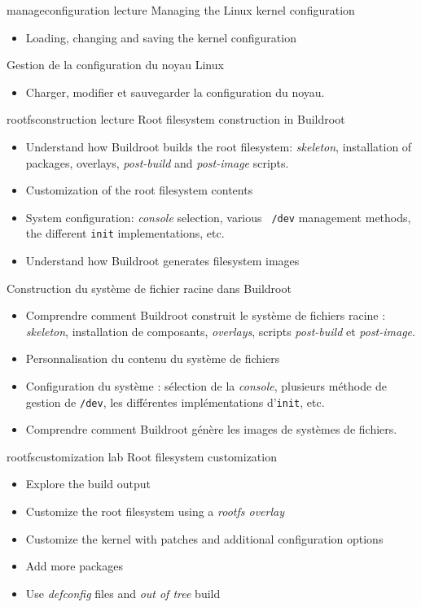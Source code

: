 {manageconfiguration}
{lecture}
{Managing the Linux kernel configuration}
{
  \begin{itemize}
  \item Loading, changing and saving the kernel configuration
  \end{itemize}
}
{Gestion de la configuration du noyau Linux}
{
  \begin{itemize}
  \item Charger, modifier et sauvegarder la configuration du noyau.
  \end{itemize}
}
{rootfsconstruction}
{lecture}
{Root filesystem construction in Buildroot}
{
  \begin{itemize}
  \item Understand how Buildroot builds the root filesystem: {\em
      skeleton}, installation of packages, overlays, {\em post-build}
    and {\em post-image} scripts.
  \item Customization of the root filesystem contents
  \item System configuration: {\em console} selection, various {\tt
      /dev} management methods, the different {\tt init}
    implementations, etc.
  \item Understand how Buildroot generates filesystem images
  \end{itemize}
}
{Construction du système de fichier racine dans Buildroot}
{
  \begin{itemize}
  \item Comprendre comment Buildroot construit le système de fichiers
	racine : {\em skeleton}, installation de composants, {\em
        overlays}, scripts {\em post-build} et {\em post-image}.
  \item Personnalisation du contenu du système de fichiers
  \item Configuration du système : sélection de la {\em console},
	plusieurs méthode de gestion de {\tt /dev}, les différentes
	implémentations d'{\tt init}, etc.
  \item Comprendre comment Buildroot génère les images de systèmes de
	fichiers.
  \end{itemize}
}
{rootfscustomization}
{lab}
{Root filesystem customization}
{
  \begin{itemize}
  \item Explore the build output
  \item Customize the root filesystem using a {\em rootfs overlay}
  \item Customize the kernel with patches and additional configuration
    options
  \item Add more packages
  \item Use {\em defconfig} files and {\em out of tree} build
  \end{itemize}
}
